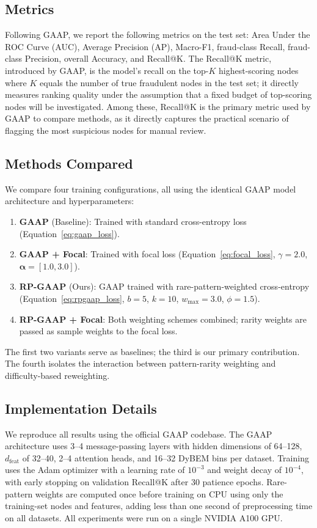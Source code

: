 \subsection{Metrics}

Following GAAP, we report the following metrics on the test set: Area Under the ROC Curve (AUC), Average Precision (AP), Macro-F1, fraud-class Recall, fraud-class Precision, overall Accuracy, and Recall@K. The Recall@K metric, introduced by GAAP, is the model's recall on the top-$K$ highest-scoring nodes where $K$ equals the number of true fraudulent nodes in the test set; it directly measures ranking quality under the assumption that a fixed budget of top-scoring nodes will be investigated. Among these, Recall@K is the primary metric used by GAAP to compare methods, as it directly captures the practical scenario of flagging the most suspicious nodes for manual review.

\subsection{Methods Compared}

We compare four training configurations, all using the identical GAAP model architecture and hyperparameters:

\begin{enumerate}
    \item \textbf{GAAP} (Baseline): Trained with standard cross-entropy loss (Equation~\ref{eq:gaap_loss}).
    \item \textbf{GAAP + Focal}: Trained with focal loss (Equation~\ref{eq:focal_loss}, $\gamma=2.0$, $\boldsymbol{\alpha}=[1.0, 3.0]$).
    \item \textbf{RP-GAAP} (Ours): GAAP trained with rare-pattern-weighted cross-entropy (Equation~\ref{eq:rpgaap_loss}, $b=5$, $k=10$, $w_{\text{max}}=3.0$, $\phi=1.5$).
    \item \textbf{RP-GAAP + Focal}: Both weighting schemes combined; rarity weights are passed as sample weights to the focal loss.
\end{enumerate}

The first two variants serve as baselines; the third is our primary contribution. The fourth isolates the interaction between pattern-rarity weighting and difficulty-based reweighting.

\subsection{Implementation Details}

We reproduce all results using the official GAAP codebase. The GAAP architecture uses 3--4 message-passing layers with hidden dimensions of 64--128, $d_{\text{feat}}$ of 32--40, 2--4 attention heads, and 16--32 DyBEM bins per dataset. Training uses the Adam optimizer with a learning rate of $10^{-3}$ and weight decay of $10^{-4}$, with early stopping on validation Recall@K after 30 patience epochs. Rare-pattern weights are computed once before training on CPU using only the training-set nodes and features, adding less than one second of preprocessing time on all datasets. All experiments were run on a single NVIDIA A100 GPU.